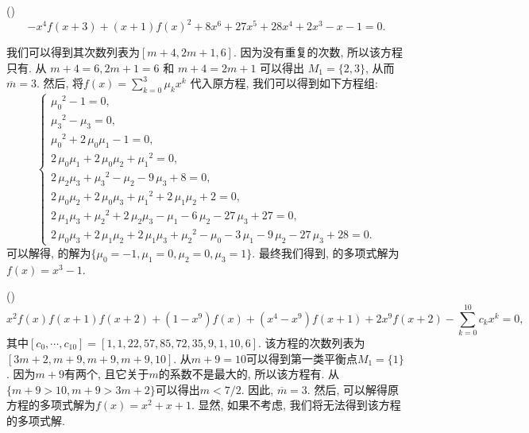 \begin{example}
(\BPone{})
\begin{equation}
-x^4f(x+3)+(x+1)f(x)^2+8x^6+27x^5+28x^4+2x^3-x-1=0 \label{ep1} .
\end{equation}

我们可以得到其次数列表为$[m+4,2m+1,6]$. 因为没有重复的次数, 所以该方程只有\BPone{}. 从 $m+4=6,2m+1=6$ 和 $m+4=2m+1$ 可以得出 $M_1=\{2,3\}$, 从而$\overline m = 3$. 然后, 将$f(x)=\sum\nolimits_{k=0}^3{\mu_k x^k}$ 代入原方程, 我们可以得到如下方程组:
\begin{equation}
\left\{
\begin{array}{l}
    {\mu_{{0}}}^{2}-1=0,                                                                                                  \\
    {\mu_{{3}}}^{2}-\mu_{{3}}=0,                                                                                            \\
    {\mu_{{0}}}^{2}+2\,\mu_{{0}}\mu_{{1}}-1=0,                                                                                \\
    2\,\mu_{{0}}\mu_{{1}}+2\,\mu_{{0}}\mu_{{2}}+{\mu_{{1}}}^{2}=0,                                                                \\
    2\,\mu_{{2}}\mu_{{3}}+{\mu_{{3}}}^{2}-\mu_{{2}}-9\,\mu_{{3}}+8=0,                                                             \\
    2\,\mu_{{0}}\mu_{{2}}+2\,\mu_{{0}}\mu_{{3}}+{\mu_{{1}}}^{2}+2\,\mu_{{1}}\mu_{{2}}+2=0,                                            \\
    2\,\mu_{{1}}\mu_{{3}}+{\mu_{{2}}}^{2}+2\,\mu_{{2}}\mu_{{3}}-\mu_{{1}}-6\,\mu_{{2}}-27\,\mu_{{3}}+27=0,                              \\
    2\,\mu_{{0}}\mu_{{3}}+2\,\mu_{{1}}\mu_{{2}}+2\,\mu_{{1}}\mu_{{3}}+{\mu_{{2}}}^{2}-\mu_{{0}}-3\,\mu_{{1}}-9\,\mu_{{2}}-27\,\mu_{{3}}+28=0.
\end{array}
\right.
\label{ceqs}
\end{equation}
可以解得, 的解为$\{\mu_0=-1,\mu_1=0,\mu_2=0,\mu_3=1\}$. 最终我们得到, 的多项式解为$f(x)=x^3-1$.
\end{example}

\begin{example}
(\BPtwo{})
\begin{equation}
x^2f(x)f(x+1)f(x+2)+(1-x^9)f(x)+(x^4-x^9)f(x+1)+2x^9f(x+2)-\sum_{k=0}^{10}{c_k x^k}=0, \label{ep2}
\end{equation}
其中$[c_0,\cdots,c_{10}]=[1,1,22,57,85,72,35,9,1,10,6]$. 该方程的次数列表为$[3m+2,m+9,m+9,m+9,10]$. 从$m+9=10$可以得到第一类平衡点$M_1=\{1\}$. 因为$m+9$有两个, 且它关于$m$的系数不是最大的, 所以该方程有\BPtwo{}. 从$\{m+9> 10,m+9> 3m+2\}$可以得出$m< 7/2$. 因此, $\overline m=3$. 然后, 可以解得原方程的多项式解为$f(x)=x^2+x+1$. 显然, 如果不考虑\BPtwo{}, 我们将无法得到该方程的多项式解. 
\end{example}

